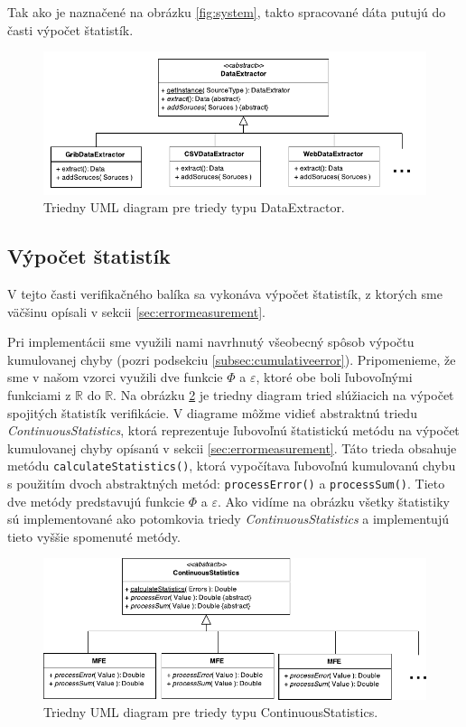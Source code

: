 \noindent Tak ako je naznačené na obrázku \ref{fig:system},  takto spracované dáta putujú do časti výpočet štatistík.

\begin{figure}
	\centering
	\includegraphics[width = 6in]{dataextractor}
	\caption{Triedny UML diagram pre triedy typu DataExtractor.}
	\label{fig:dataextractor} 
\end{figure}

\subsection{Výpočet štatistík}
V tejto časti verifikačného balíka sa vykonáva výpočet štatistík, z ktorých sme väčšinu opísali v sekcii \ref{sec:errormeasurement}. 

Pri implementácii sme využili nami navrhnutý všeobecný spôsob výpočtu kumulovanej chyby (pozri podsekciu \ref{subsec:cumulativeerror}). Pripomenieme, že sme v našom vzorci využili  dve funkcie $ \Phi $ a $ \varepsilon $, ktoré obe boli ľubovoľnými funkciami z $\mathbb{R}$ do $\mathbb{R}$. Na obrázku \ref{fig:stats} je triedny diagram tried slúžiacich na výpočet spojitých štatistík verifikácie. V diagrame môžme vidieť abstraktnú triedu \textit{ContinuousStatistics}, ktorá reprezentuje ľubovoľnú štatistickú metódu na výpočet kumulovanej chyby opísanú v sekcii \ref{sec:errormeasurement}. Táto trieda obsahuje metódu \texttt{calculateStatistics()}, ktorá vypočítava ľubovoľnú kumulovanú chybu s použitím dvoch abstraktných metód: \texttt{processError()} a \texttt{processSum()}. Tieto dve metódy predstavujú funkcie $ \Phi $ a $ \varepsilon $. Ako vidíme na obrázku všetky štatistiky sú implementované ako potomkovia triedy \textit{ContinuousStatistics} a implementujú tieto vyššie spomenuté metódy. 

 \pagebreak 
             
\begin{figure}
	\centering
	\includegraphics[width = 5in]{stats}
	\caption{Triedny UML diagram pre triedy typu ContinuousStatistics.}
	\label{fig:stats} 
\end{figure}

